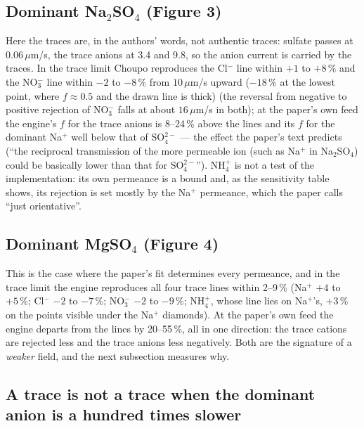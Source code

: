 \subsection*{Dominant Na$_2$SO$_4$ (Figure 3)}



Here the traces are, in the authors' words, not authentic traces: sulfate
passes at $0.06\,\mu$m/s, the trace anions at 3.4 and 9.8, so the anion
current is carried by the traces.  In the trace limit Choupo reproduces
the Cl$^-$ line within $+1$ to $+8\,\%$ and the NO$_3^-$ line within
$-2$ to $-8\,\%$ from $10\,\mu$m/s upward ($-18\,\%$ at the lowest point,
where $f \approx 0.5$ and the drawn line is thick) (the reversal from negative to
positive rejection of NO$_3^-$ falls at about $16\,\mu$m/s in both); at the
paper's own feed the engine's $f$ for the trace anions is 8--24\,\% above
the lines and its $f$ for the dominant Na$^+$ well below that of
SO$_4^{2-}$ --- the effect the paper's text predicts (``the reciprocal
transmission of the more permeable ion (such as Na$^+$ in Na$_2$SO$_4$)
could be basically lower than that for SO$_4^{2-}$'').  NH$_4^+$ is not a
test of the implementation: its own permeance is a bound and, as the
sensitivity table shows, its rejection is set mostly by the Na$^+$
permeance, which the paper calls ``just orientative''.

\subsection*{Dominant MgSO$_4$ (Figure 4)}



This is the case where the paper's fit determines every permeance, and in
the trace limit the engine reproduces all four trace lines within 2--9\,\%
(Na$^+$ $+4$ to $+5\,\%$; Cl$^-$ $-2$ to $-7\,\%$; NO$_3^-$ $-2$ to
$-9\,\%$; NH$_4^+$, whose line lies on Na$^+$'s, $+3\,\%$ on the points
visible under the Na$^+$ diamonds).  At the paper's own feed the engine
departs from the lines by 20--55\,\%, all in one direction: the trace
cations are rejected less and the trace anions less negatively.  Both are
the signature of a \emph{weaker} field, and the next subsection measures
why.

\subsection*{A trace is not a trace when the dominant anion is a hundred times slower}

